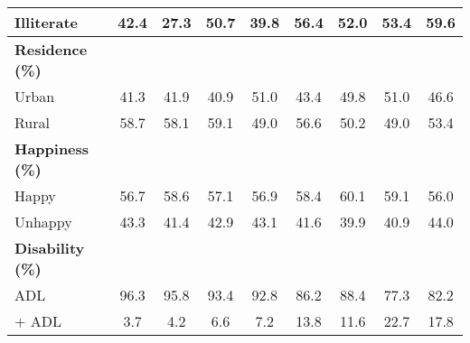 \begin{table}[htbp]
{\begin{tabular}{lcccccccc}
      \quad Illiterate   & 42.4                                & 27.3                                & 50.7                                & 39.8                                & 56.4              & 52.0              & 53.4              & 59.6              \\
      \midrule
      \textbf{Residence (\%)}                                                                                                                                                                                                                                    \\
      \quad Urban        & 41.3                                & 41.9                                & 40.9                                & 51.0                                & 43.4              & 49.8              & 51.0              & 46.6              \\
      \quad Rural        & 58.7                                & 58.1                                & 59.1                                & 49.0                                & 56.6              & 50.2              & 49.0              & 53.4              \\
      \midrule
      \textbf{Happiness (\%)}                                                                                                                                                                                                                                    \\
      \quad Happy        & 56.7                                & 58.6                                & 57.1                                & 56.9                                & 58.4              & 60.1              & 59.1              & 56.0              \\
      \quad Unhappy      & 43.3                                & 41.4                                & 42.9                                & 43.1                                & 41.6              & 39.9              & 40.9              & 44.0              \\
      \midrule
      \textbf{Disability (\%)}                                                                                                                                                                                                                                   \\
      \quad 0 ADL        & 96.3                                & 95.8                                & 93.4                                & 92.8                                & 86.2              & 88.4              & 77.3              & 82.2              \\
      \quad 1+ ADL       & 3.7                                 & 4.2                                 & 6.6                                 & 7.2                                 & 13.8              & 11.6              & 22.7              & 17.8              \\
      \bottomrule
    \end{tabular}%
  }
\end{table}
